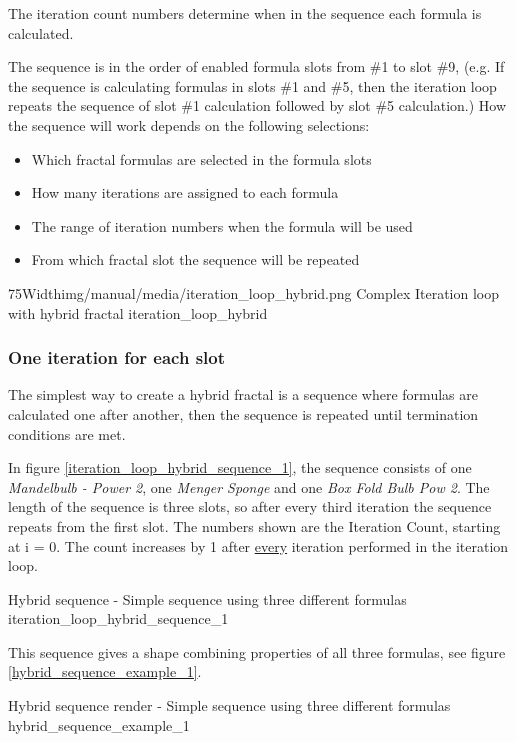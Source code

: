 The iteration count numbers determine when in the sequence each formula is calculated.

The sequence is in the order of enabled formula slots from \#1 to slot \#9, (e.g. If the sequence is calculating formulas in slots
\#1 and \#5, then the iteration loop repeats the sequence of slot \#1 calculation followed by slot
\#5 calculation.)
How the sequence will work depends on the following selections:
\begin{itemize}
	\item Which fractal formulas are selected in the formula slots
	\item How many iterations are assigned to each formula
	\item The range of iteration numbers when the formula will be used
	\item From which fractal slot the sequence will be repeated
\end{itemize}

\simpleImageWithCaption75Width{img/manual/media/iteration_loop_hybrid.png}
{Complex Iteration loop with hybrid fractal}
{iteration_loop_hybrid}

\subsubsection{One iteration for each slot}

The simplest way to create a hybrid fractal is a sequence where formulas are calculated one after another, then the sequence is repeated until termination conditions are met.

In figure \ref{iteration_loop_hybrid_sequence_1}, the sequence consists of one \emph{Mandelbulb - Power 2}, one \emph{Menger Sponge} and
one \emph{Box Fold Bulb Pow 2}. The length of the sequence is three slots, so after every third iteration the sequence repeats from the first slot. The numbers shown are the Iteration Count, starting at i = 0. The count increases by 1 after \underline{every} iteration performed in the iteration loop.

{Hybrid sequence - Simple sequence using three different formulas}
{iteration_loop_hybrid_sequence_1}

This sequence gives a shape combining properties of all three
formulas, see figure \ref{hybrid_sequence_example_1}.

{Hybrid sequence render - Simple sequence using three different formulas}
{hybrid_sequence_example_1}

